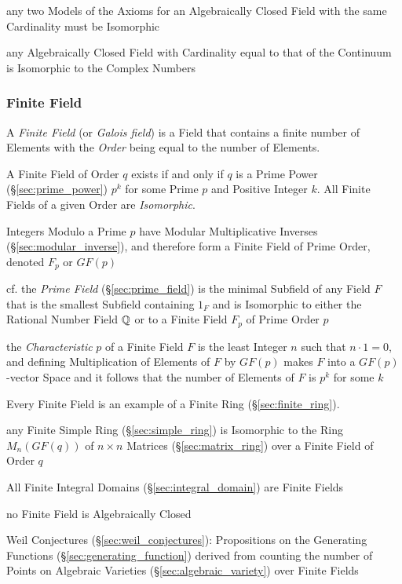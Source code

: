 any two Models of the Axioms for an Algebraically Closed Field with the same
Cardinality must be Isomorphic

any Algebraically Closed Field with Cardinality equal to that of the Continuum
is Isomorphic to the Complex Numbers



\subsubsection{Finite Field}\label{sec:finite_field}

A \emph{Finite Field} (or \emph{Galois field}) is a Field that contains a
finite number of Elements with the \emph{Order} being equal to the number of
Elements.

A Finite Field of Order $q$ exists if and only if $q$ is a Prime Power
(\S\ref{sec:prime_power}) $p^k$ for some Prime $p$ and Positive Integer $k$.
All Finite Fields of a given Order are \emph{Isomorphic}.

Integers Modulo a Prime $p$ have Modular Multiplicative Inverses
(\S\ref{sec:modular_inverse}), and therefore form a Finite Field of Prime Order,
denoted $F_p$ or $GF(p)$

\fist cf. the \emph{Prime Field} (\S\ref{sec:prime_field}) is the minimal
Subfield of any Field $F$ that is the smallest Subfield containing $1_F$ and is
Isomorphic to either the Rational Number Field $\mathbb{Q}$ or to a Finite Field
$F_p$ of Prime Order $p$

the \emph{Characteristic} $p$ of a Finite Field $F$ is the least Integer $n$
such that $n \cdot 1 = 0$, and defining Multiplication of Elements of $F$ by
$GF(p)$ makes $F$ into a $GF(p)$-vector Space and it follows that the number of
Elements of $F$ is $p^k$ for some $k$

Every Finite Field is an example of a Finite Ring (\S\ref{sec:finite_ring}).

any Finite Simple Ring (\S\ref{sec:simple_ring}) is Isomorphic to the Ring
$M_n(GF(q))$ of $n \times n$ Matrices (\S\ref{sec:matrix_ring}) over a Finite
Field of Order $q$

All Finite Integral Domains (\S\ref{sec:integral_domain}) are Finite Fields

no Finite Field is Algebraically Closed

Weil Conjectures (\S\ref{sec:weil_conjectures}): Propositions on the Generating
Functions (\S\ref{sec:generating_function}) derived from counting the number of
Points on Algebraic Varieties (\S\ref{sec:algebraic_variety}) over Finite Fields

